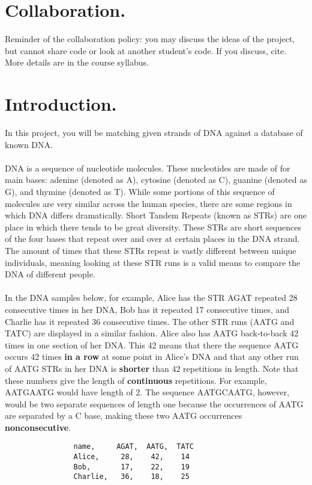 \documentclass[11pt, letterpaper, onecolumn, oneside, final]{article}
\begin{document}
    \maketitle



    \section{Collaboration.} Reminder of the collaboration policy: you may discuss the ideas of the project, but cannot share code or look at another student’s code. If you discuss, cite. More details are in the course syllabus. 

    \section{Introduction.} In this project, you will be matching given strands of DNA against a database of known DNA. \\ 
    \\
    DNA is a sequence of nucleotide molecules. These nucleotides are made of for main bases: adenine (denoted as A), cytosine (denoted as C), guanine (denoted as G), and thymine (denoted as T). While some portions of this sequence of molecules are very similar across the human species, there are some regions in which DNA differs dramatically. Short Tandem Repeats (known as STRs) are one place in which there tends to be great diversity. These STRs are short sequences of the four bases that repeat over and over at certain places in the DNA strand. The amount of times that these STRs repeat is vastly different between unique individuals, meaning looking at these STR runs is a valid means to compare the DNA of different people. \\
    \\
    
 In the DNA samples below, for example, Alice has the STR {\consolas AGAT} repeated 28 consecutive times in her DNA, Bob has it repeated 17 consecutive times, and Charlie has it repeated 36 consecutive times. The other STR runs ({\consolas AATG} and {\consolas TATC}) are displayed in a similar fashion. Alice also has {\consolas AATG} back-to-back 42 times in one section of her DNA. This 42 means that there the sequence {\consolas AATG} occurs 42 times \textbf{in a row} at some point in Alice's DNA and that any other run of {\consolas AATG} STRs in her DNA is \textbf{shorter} than 42 repetitions in length. Note that these numbers  give the length of \textbf{continuous} repetitions. For example, {\consolas AATGAATG} would have length of 2. The sequence {\consolas AATGCAATG}, however, would be two separate sequences of length one because the occurrences of {\consolas AATG} are separated by a {\consolas C} base, making these two {\consolas AATG} occurrences \textbf{nonconsecutive}.
\begin{lstlisting}
                name,     AGAT,  AATG,  TATC
                Alice,     28,    42,    14
                Bob,       17,    22,    19
                Charlie,   36,    18,    25
\end{lstlisting}
\end{document}

